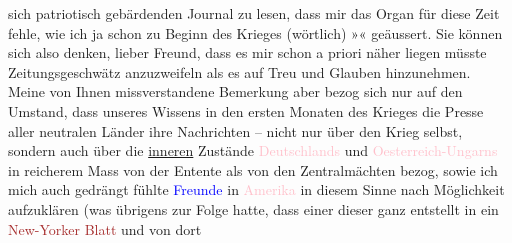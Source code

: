                     sich patr\introOben{}i\introOben{}otisch gebärdenden Journal zu lesen, dass mir
                    das Organ für diese Zeit fehle, wie ich ja schon zu Beginn des Krieges
                    (wörtlich) »\textcolor{green}{\label{K_L02224_3v}\label{K_L02224_3h}}{}« geäussert. Sie können sich also
                    denken, lieber Freund, dass es mir schon a priori näher liegen müsste  Zeitungsgeschwätz anzuzweifeln als es
                    auf Treu und Glauben hinzunehmen. Meine von Ihnen missverstandene Bemerkung aber
                    bezog sich nur auf den Umstand, dass unseres Wissens in den {\pb}ersten Monaten des Krieges die Presse aller
                    neutralen Länder ihre Nachrichten – nicht nur über den Krieg selbst, sondern
                    auch über die \uline{inneren} Zustände \textcolor{pink}{Deutschlands}{}\ledrightnote{\textcolor{pink}{Deutschland}} und \textcolor{pink}{Oesterreich-Ungarns}{}\ledrightnote{\textcolor{pink}{Österreich-Ungarn}} in reicherem Mass von der Entente als von den
                    Zentralmächten bezog, sowie ich mich auch gedrängt fühlte \textcolor{blue}{Freunde}{} in \textcolor{pink}{Amerika}{}\ledrightnote{\textcolor{pink}{Amerika}} in diesem Sinne nach Möglichkeit aufzuklären (was übrigens zur
                    Folge hatte, dass einer dieser \label{K_L02224_4v}\label{K_L02224_4h} ganz entstellt in ein \textcolor{brown}{New-Yorker Blatt}{} und von dort
